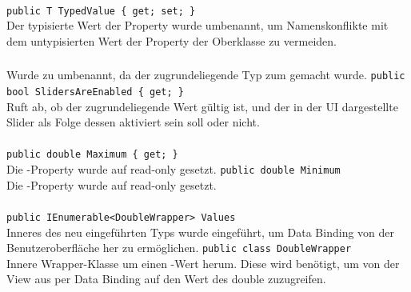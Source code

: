 \paragraph{}
\begin{itemize}
	\change \verb!public T TypedValue { get; set; }! \\
	Der typisierte Wert der Property wurde umbenannt, um Namenskonflikte mit dem untypisierten Wert der Property der Oberklasse zu vermeiden.
\end{itemize}
\subsubsection{}

\paragraph{}
\begin{itemize}
	\change Wurde zu  umbenannt, da der zugrundeliegende Typ zum  gemacht wurde.
	\add \verb!public bool SlidersAreEnabled { get; }! \\
	Ruft ab, ob der zugrundeliegende Wert gültig ist, und der in der UI dargestellte Slider als Folge dessen aktiviert sein soll oder nicht.
\end{itemize}

\paragraph{}
\begin{itemize}
	\change \verb!public double Maximum { get; }! \\
	Die -Property wurde auf read-only gesetzt.
	\change \verb!public double Minimum! \\
	Die -Property wurde auf read-only gesetzt.
\end{itemize}

\paragraph{}
\begin{itemize}
	\add \verb!public IEnumerable<DoubleWrapper> Values! \\
	Inneres  des neu eingeführten Typs  wurde eingeführt, um Data Binding von der Benutzeroberfläche her zu ermöglichen.
	\add \verb!public class DoubleWrapper! \\
	Innere Wrapper-Klasse um einen -Wert herum. Diese wird benötigt, um von der View aus per Data Binding auf den Wert des double zuzugreifen.
\end{itemize}

